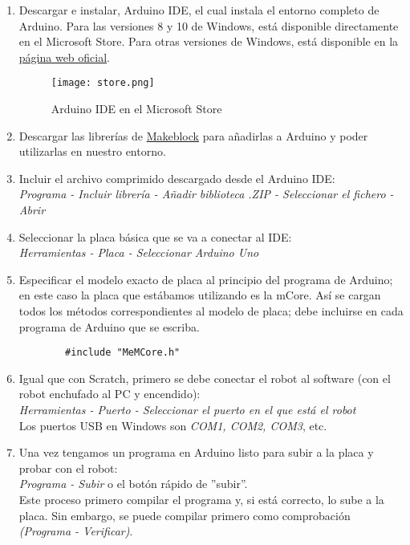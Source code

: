 \begin{enumerate}
	\item Descargar e instalar, Arduino IDE, el cual instala el entorno completo de Arduino. Para las versiones 8 y 10 de Windows, está disponible directamente en el Microsoft Store. Para otras versiones de Windows, está disponible en la  \href{https://www.arduino.cc/en/software}{página web oficial}.
	\begin{figure}[h]
		\texttt{[image: store.png]}
		\centering
		\label{img:MStore}
		\caption{Arduino IDE en el Microsoft Store}
	\end{figure}
	\item Descargar las librerías de \href{https://codeload.github.com/Makeblock-official/Makeblock-Libraries/zip/master}{Makeblock} para añadirlas a Arduino y poder utilizarlas en nuestro entorno.
	\item Incluir el archivo comprimido descargado desde el Arduino IDE:\\ \textit{Programa - Incluir librería - Añadir biblioteca .ZIP - Seleccionar el fichero - Abrir}
	\item Seleccionar la placa básica que se va a conectar al IDE:\\
	\textit{Herramientas - Placa - Seleccionar Arduino Uno}
	\item Especificar el modelo exacto de placa al principio del programa de Arduino; en este caso la placa que estábamos utilizando es la mCore. Así se cargan todos los métodos correspondientes al modelo de placa; debe incluirse en cada programa de Arduino que se escriba.
	\begin{verbatim}	
		#include "MeMCore.h"	
	\end{verbatim}
	\item Igual que con Scratch, primero se debe conectar el robot al software (con el robot enchufado al PC y encendido):\\
	\textit{Herramientas - Puerto - Seleccionar el puerto en el que está el robot} \\
	Los puertos USB en Windows son \textit{COM1, COM2, COM3}, etc.
	\item  Una vez tengamos un programa en Arduino listo para subir a la placa y probar con el robot:\\
	\textit{Programa - Subir } o el botón rápido de ''subir''. \\
	Este proceso primero compilar el programa y, si está correcto, lo sube a la placa. Sin embargo, se puede compilar primero como comprobación \textit{(Programa - Verificar)}.
\end{enumerate}
